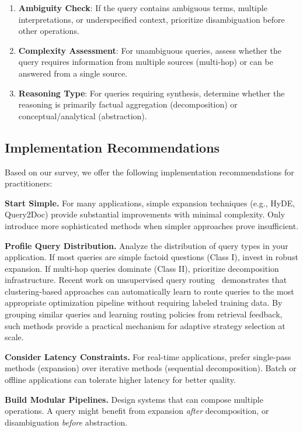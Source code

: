 \documentclass{article}
\begin{document}
\begin{enumerate}[leftmargin=*,nosep]
    \item \textbf{Ambiguity Check}: If the query contains ambiguous terms, multiple interpretations, or underspecified context, prioritize disambiguation before other operations.
    \item \textbf{Complexity Assessment}: For unambiguous queries, assess whether the query requires information from multiple sources (multi-hop) or can be answered from a single source.
    \item \textbf{Reasoning Type}: For queries requiring synthesis, determine whether the reasoning is primarily factual aggregation (decomposition) or conceptual/analytical (abstraction).
\end{enumerate}

\subsection{Implementation Recommendations}

Based on our survey, we offer the following implementation recommendations for practitioners:

\textbf{Start Simple.} For many applications, simple expansion techniques (e.g., HyDE, Query2Doc) provide substantial improvements with minimal complexity. Only introduce more sophisticated methods when simpler approaches prove insufficient.

\textbf{Profile Query Distribution.} Analyze the distribution of query types in your application. If most queries are simple factoid questions (Class I), invest in robust expansion. If multi-hop queries dominate (Class II), prioritize decomposition infrastructure. Recent work on unsupervised query routing~\citep{UnsupervisedQueryRouting} demonstrates that clustering-based approaches can automatically learn to route queries to the most appropriate optimization pipeline without requiring labeled training data. By grouping similar queries and learning routing policies from retrieval feedback, such methods provide a practical mechanism for adaptive strategy selection at scale.

\textbf{Consider Latency Constraints.} For real-time applications, prefer single-pass methods (expansion) over iterative methods (sequential decomposition). Batch or offline applications can tolerate higher latency for better quality.

\textbf{Build Modular Pipelines.} Design systems that can compose multiple operations. A query might benefit from expansion \textit{after} decomposition, or disambiguation \textit{before} abstraction.
\end{document}
